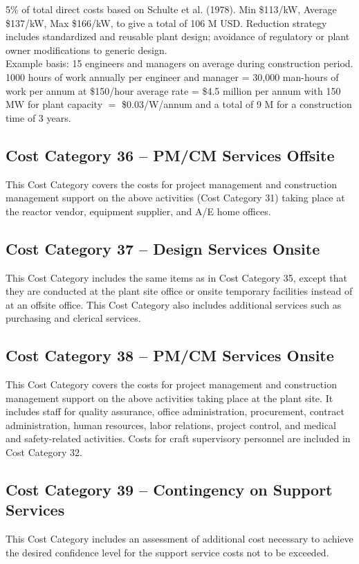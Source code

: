 5\% of total direct costs based on Schulte et al. (1978). Min \$113/kW, Average \$137/kW, Max 
\$166/kW, to give a total of 106 M USD.  Reduction strategy includes standardized and reusable plant design; avoidance of regulatory or 
plant owner modifications to generic design.\\


Example basis: 15 engineers and managers on average during construction period. 
1000 hours of work annually per engineer and manager = 30,000 man-hours of work per 
annum at \$150/hour average rate = \$4.5 million per annum with 150 MW for plant capacity $=$ \$0.03/W/annum and a total of 9 M for a construction time of 3 years. 


\subsection*{Cost Category 36 – PM/CM Services Offsite}
This Cost Category covers the costs for project management and construction management support on the above activities (Cost Category 31) taking place at the reactor vendor, equipment supplier, and A/E home offices.

\subsection*{Cost Category 37 – Design Services Onsite}
This Cost Category includes the same items as in Cost Category 35, except that they are conducted at the plant site office or onsite temporary facilities instead of at an offsite office. This Cost Category also includes additional services such as purchasing and clerical services.

\subsection*{Cost Category 38 – PM/CM Services Onsite}
This Cost Category covers the costs for project management and construction management support on the above activities taking place at the plant site. It includes staff for quality assurance, office administration, procurement, contract administration, human resources, labor relations, project control, and medical and safety-related activities. Costs for craft supervisory personnel are included in Cost Category 32.

\subsection*{Cost Category 39 – Contingency on Support Services}
This Cost Category includes an assessment of additional cost necessary to achieve the desired confidence level for the support service costs not to be exceeded.

